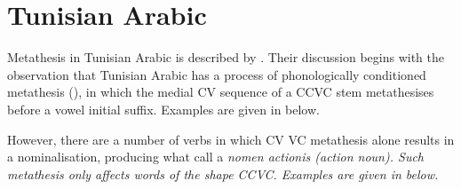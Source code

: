
\section{Tunisian Arabic}\label{sec:TunAra}
Metathesis in Tunisian Arabic is described by \cite{kidr86}.
Their discussion begins with the observation that Tunisian Arabic has a process of
phonologically conditioned metathesis (),
in which the medial CV sequence of a CCVC stem metathesises
before a vowel initial suffix.
Examples are given in  below.

\begin{exe}
	\label{ex:TunAraMorMet}
\end{exe}

However, there are a number of verbs in which CV {\ra} VC metathesis
alone results in a nominalisation, producing what \citeauthor{kidr86}
call a \it{nomen actionis} (action noun).
Such metathesis only affects words of the shape CCVC.
Examples are given in  below.

\begin{exe}
	\label{ex:TunAraDerMet}
\end{exe}

